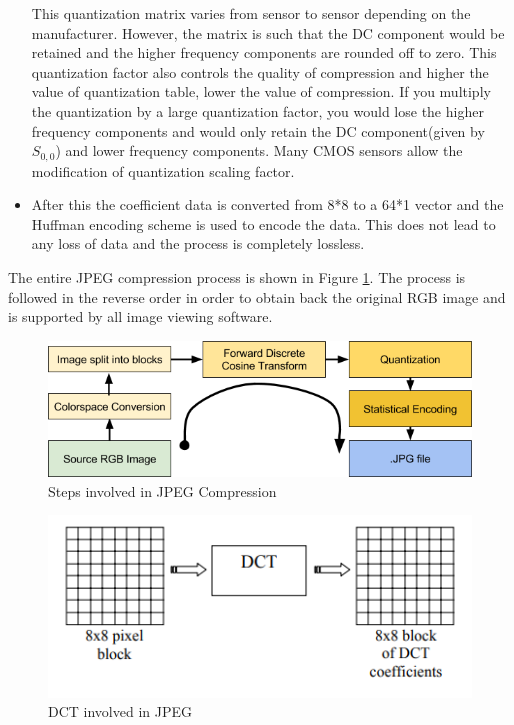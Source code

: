 \begin{itemize}
This quantization matrix varies from sensor to sensor depending on the manufacturer. However, the matrix is such that the DC component would be retained and the higher frequency components are rounded off to zero. This quantization factor also controls the quality of compression and higher the value of quantization table, lower the value of compression. If you multiply the quantization by a large quantization factor, you would lose the higher frequency components and would only retain the DC component(given by $S_{0,0}$) and lower frequency components. Many CMOS sensors allow the modification of quantization scaling factor.
\item After this the coefficient data is converted from 8*8 to a 64*1 vector and the Huffman encoding scheme is used to encode the data. This does not lead to any loss of data and the process is completely lossless.
\end{itemize}
The entire JPEG compression process is shown in Figure \ref{fig:jpeg}. The process is followed in the reverse order in order to obtain back the original RGB image and is supported by all image viewing software.

\begin{figure}[]
\centering
\includegraphics[scale=0.50]{pics/jpegcompression.png}
\caption{Steps involved in JPEG Compression\cite{Jpeg}}
\label{fig:jpeg}
\end{figure}

\begin{figure}[]
\centering
\includegraphics[scale=1]{pics/dct.PNG}
\caption{DCT involved in JPEG\cite{dct}}
\label{fig:dct}
\end{figure}
